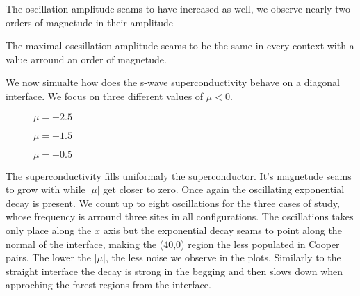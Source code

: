 \documentclass[..\main.tex]{subfile}
\begin{document}
The oscillation amplitude seams to have increased as well,
we observe nearly two orders of magnetude in their amplitude
 
 The maximal
 oscsillation amplitude seams to be the same in every context with a value arround an order of magnetude.



We now simualte how does the s-wave superconductivity behave on a diagonal interface. We focus on three different values of $\mu<0$.  
\begin{figure}[H]
    \centering
    
    \caption{$\mu = -2.5$}
\end{figure}
\begin{figure}[H]
    \centering
    
    \caption{$\mu = -1.5$}
\end{figure}
\begin{figure}[H]
    \centering
    
    \caption{$\mu = -0.5$}
\end{figure}
The superconductivity fills uniformaly the superconductor. It's magnetude seams to grow with while $|\mu|$ get closer to zero.
Once again the oscillating exponential decay is present. We count up to eight oscillations for the three cases of study, whose
frequency is arround three sites in all configurations. The oscillations takes only place along the $x$ axis but the exponential decay
seams to point along the normal of the interface, making the (40,0) region the less populated in Cooper pairs.
The lower the $|\mu|$, the less noise we observe in the plots. Similarly to the straight interface the decay is strong in the begging
and then slows down when approching the farest regions from the interface.\\



\end{document}
